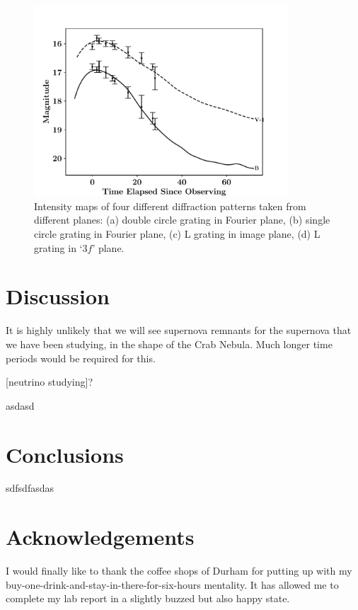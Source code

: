 \documentclass[twocolumn]{revtex4}
\begin{document}
\begin{figure}[!h]
\begin{center}
\includegraphics[width=9.5cm]{results/2017hhz}
\caption[]{Intensity maps of four different diffraction patterns taken from different planes: (a) double circle grating in Fourier plane, (b) single circle grating in Fourier plane, (c) L grating in image plane, (d) L grating in `$3f$' plane.}
\label{2017hhz-data}
\end{center}
\end{figure}

\vspace{-3ex}
\section{Discussion}
\vspace{-2ex}

It is highly unlikely that we will see supernova remnants for the supernova that we have been studying, in the shape of the Crab Nebula. Much longer time periods would be required for this. 

[neutrino studying]?

asdasd

\vspace{-5ex}
\section{Conclusions}
\vspace{-2ex}

sdfsdfasdas

\vspace{-5ex}
\section*{Acknowledgements}
\vspace{-2ex}
I would finally like to thank the coffee shops of Durham for putting up with my buy-one-drink-and-stay-in-there-for-six-hours mentality. It has allowed me to complete my lab report in a slightly buzzed but also happy state.
\end{document}
